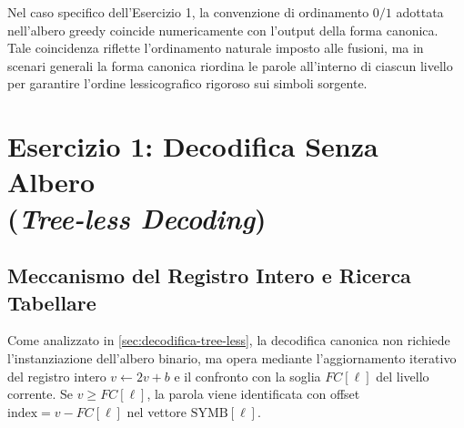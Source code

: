 \begin{table}[H]
\centering
\caption{Confronto analitico tra codici di Huffman standard e canonici ricavati per l'alfabeto $A$.}
\label{tab:confronto-standard-canonico}
\vspace{2mm}
\end{table}

\begin{remark}
Nel caso specifico dell'Esercizio 1, la convenzione di ordinamento $0/1$ adottata nell'albero greedy coincide numericamente con l'output della forma canonica. Tale coincidenza riflette l'ordinamento naturale imposto alle fusioni, ma in scenari generali la forma canonica riordina le parole all'interno di ciascun livello per garantire l'ordine lessicografico rigoroso sui simboli sorgente.
\end{remark}

\FloatBarrier
\section[Esercizio 1: Decodifica Senza Albero]{Esercizio 1: Decodifica Senza Albero\\(\textit{Tree-less Decoding})}
\label{sec:esercizio-huffman-treeless-decoding}

\subsection{Meccanismo del Registro Intero e Ricerca Tabellare}
\label{subsec:meccanismo-registro-decodifica}

Come analizzato in \autoref{sec:decodifica-tree-less}, la decodifica canonica non richiede l'instanziazione dell'albero binario, ma opera mediante l'aggiornamento iterativo del registro intero $v \leftarrow 2v + b$ e il confronto con la soglia $FC[\ell]$ del livello corrente. Se $v \ge FC[\ell]$, la parola viene identificata con offset $\text{index} = v - FC[\ell]$ nel vettore $\text{SYMB}[\ell]$.


